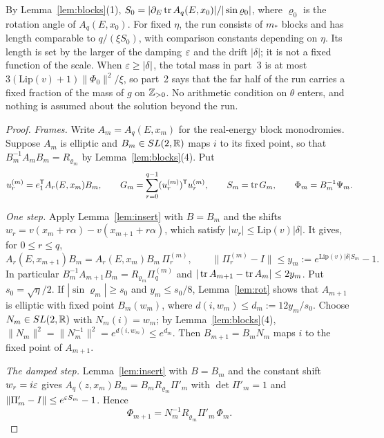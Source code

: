 By Lemma~\ref{lem:blocks}(1), $S_0=|\partial_E\operatorname{tr} A_q(E,x_0)|/|\sin\varrho_0|$, where $\varrho_0$ is the rotation angle of $A_q(E,x_0)$. For fixed $\eta$, the run consists of $m_*$ blocks and has length comparable to $q/(\xi S_0)$, with comparison constants depending on $\eta$. Its length is set by the larger of the damping $\varepsilon$ and the drift $|\delta|$; it is not a fixed function of the scale. When $\varepsilon\ge|\delta|$, the total mass in part~3 is at most $3(\mathrm{Lip}(v)+1)\|\Phi_0\|^2/\xi$, so part~2 says that the far half of the run carries a fixed fraction of the mass of $g$ on $\mathbb Z_{>0}$. No arithmetic condition on $\theta$ enters, and nothing is assumed about the solution beyond the run.

\begin{proof}
\emph{Frames.} Write $A_m=A_q(E,x_m)$ for the real-energy block monodromies. Suppose $A_m$ is elliptic and $B_m\in SL(2,\mathbb R)$ maps $i$ to its fixed point, so that $B_m^{-1}A_mB_m=R_{\varrho_m}$ by Lemma~\ref{lem:blocks}(4). Put
\[
u_r^{(m)}=e_1^{\mathsf T}A_r(E,x_m)B_m,\qquad G_m=\sum_{r=0}^{q-1}(u_r^{(m)})^{\mathsf T}u_r^{(m)},\qquad S_m=\operatorname{tr} G_m,\qquad\Phi_m=B_m^{-1}\Psi_m .
\]

\emph{One step.} Apply Lemma~\ref{lem:insert} with $B=B_m$ and the shifts $w_r=v(x_m+r\alpha)-v(x_{m+1}+r\alpha)$, which satisfy $|w_r|\le\mathrm{Lip}(v)|\delta|$. It gives, for $0\le r\le q$,
\[
A_r(E,x_{m+1})B_m=A_r(E,x_m)B_m\,\Pi^{(m)}_r,\qquad\|\Pi^{(m)}_r-I\|\le y_m:=e^{\mathrm{Lip}(v)|\delta|S_m}-1 .
\]
In particular $B_m^{-1}A_{m+1}B_m=R_{\varrho_m}\Pi^{(m)}_q$ and $|\operatorname{tr} A_{m+1}-\operatorname{tr} A_m|\le2y_m$. Put $s_0=\sqrt\eta/2$. If $|\sin\varrho_m|\ge s_0$ and $y_m\le s_0/8$, Lemma~\ref{lem:rot} shows that $A_{m+1}$ is elliptic with fixed point $B_m(w_m)$, where $d(i,w_m)\le d_m:=12y_m/s_0$. Choose $N_m\in SL(2,\mathbb R)$ with $N_m(i)=w_m$; by Lemma~\ref{lem:blocks}(4), $\|N_m\|^2=\|N_m^{-1}\|^2=e^{d(i,w_m)}\le e^{d_m}$. Then $B_{m+1}=B_mN_m$ maps $i$ to the fixed point of $A_{m+1}$.

\emph{The damped step.} Lemma~\ref{lem:insert} with $B=B_m$ and the constant shift $w_r=i\varepsilon$ gives $A_q(z,x_m)B_m=B_mR_{\varrho_m}\Pi'_m$ with $\det\Pi'_m=1$ and $\|\Pi'_m-I\|\le e^{\varepsilon S_m}-1$. Hence
\[
\Phi_{m+1}=N_m^{-1}R_{\varrho_m}\Pi'_m\,\Phi_m .
\]


\end{proof}
